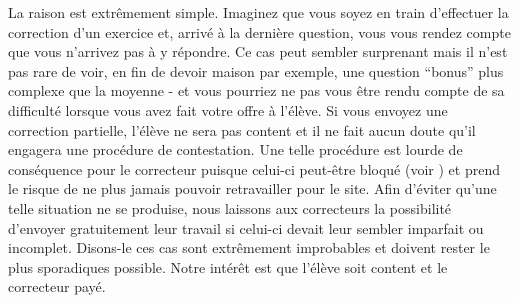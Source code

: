 ﻿La raison est extrêmement simple. Imaginez que vous soyez en train d'effectuer la correction d'un exercice et, arrivé à la dernière question, vous vous rendez compte que vous n'arrivez pas à y répondre. Ce cas peut sembler surprenant mais il n'est pas rare de voir, en fin de devoir maison par exemple, une question “bonus” plus complexe que la moyenne - et vous pourriez ne pas vous être rendu compte de sa difficulté lorsque vous avez fait votre offre à l'élève. Si vous envoyez une correction partielle, l'élève ne sera pas content et il ne fait aucun doute qu'il engagera une procédure de contestation. Une telle procédure est lourde de conséquence pour le correcteur puisque celui-ci peut-être bloqué (voir ) et prend le risque de ne plus jamais pouvoir retravailler pour le site. Afin d'éviter qu'une telle situation ne se produise, nous laissons aux correcteurs la possibilité d'envoyer gratuitement leur travail si celui-ci devait leur sembler imparfait ou incomplet.
Disons-le ces cas sont extrêmement improbables et doivent rester le plus sporadiques possible. Notre intérêt est que l'élève soit content et le correcteur payé.